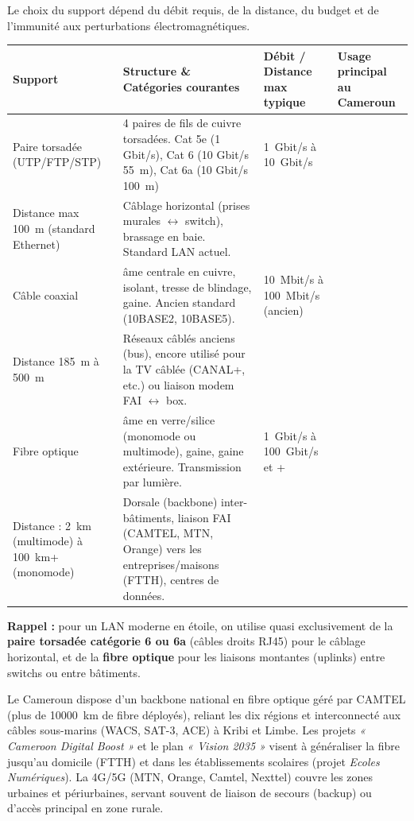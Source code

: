 \documentclass[11pt]{article}
\newcommand{\cle}[1]{{\popxbold\color{popdark}#1}}
\begin{document}
\begin{propriete}
Le choix du support dépend du débit requis, de la distance, du budget et de l'immunité aux perturbations électromagnétiques.
\begin{center}
\begin{tabularx}{\linewidth}{|l|X|X|X|}
\hline
\rowcolor{popblueL} \textbf{Support} & \textbf{Structure \& Catégories courantes} & \textbf{Débit / Distance max typique} & \textbf{Usage principal au Cameroun} \\
\hline
\cle{Paire torsadée} (UTP/FTP/STP) & 4 paires de fils de cuivre torsadées. Cat 5e (1 Gbit/s), Cat 6 (10 Gbit/s \SI{55}{m}), Cat 6a (10 Gbit/s \SI{100}{m}) & \SI{1}{Gbit/s} à \SI{10}{Gbit/s} \\ Distance max \SI{100}{m} (standard Ethernet) & Câblage horizontal (prises murales $\leftrightarrow$ switch), brassage en baie. Standard LAN actuel. \\
\hline
\cle{Câble coaxial} &âme centrale en cuivre, isolant, tresse de blindage, gaine. Ancien standard (10BASE2, 10BASE5). & \SI{10}{Mbit/s} à \SI{100}{Mbit/s} (ancien) \\ Distance \SI{185}{m} à \SI{500}{m} & Réseaux câblés anciens (bus), encore utilisé pour la TV câblée (CANAL+, etc.) ou liaison modem FAI $\leftrightarrow$ box. \\
\hline
\cle{Fibre optique} &âme en verre/silice (monomode ou multimode), gaine, gaine extérieure. Transmission par lumière. & \SI{1}{Gbit/s} à \SI{100}{Gbit/s} et + \\ Distance : \SI{2}{km} (multimode) à \SI{100}{km}+ (monomode) & Dorsale (backbone) inter-bâtiments, liaison FAI (CAMTEL, MTN, Orange) vers les entreprises/maisons (FTTH), centres de données. \\
\hline
\end{tabularx}
\end{center}
\textbf{Rappel :} pour un LAN moderne en étoile, on utilise quasi exclusivement de la \textbf{paire torsadée catégorie 6 ou 6a} (câbles droits RJ45) pour le câblage horizontal, et de la \textbf{fibre optique} pour les liaisons montantes (uplinks) entre switchs ou entre bâtiments.
\end{propriete}

\begin{savaistu}
Le Cameroun dispose d'un backbone national en fibre optique géré par CAMTEL (plus de \SI{10000}{km} de fibre déployés), reliant les dix régions et interconnecté aux câbles sous-marins (WACS, SAT-3, ACE) à Kribi et Limbe. Les projets \emph{« Cameroon Digital Boost »} et le plan \emph{« Vision 2035 »} visent à généraliser la fibre jusqu'au domicile (FTTH) et dans les établissements scolaires (projet \emph{Ecoles Numériques}). La 4G/5G (MTN, Orange, Camtel, Nexttel) couvre les zones urbaines et périurbaines, servant souvent de liaison de secours (backup) ou d'accès principal en zone rurale.
\end{savaistu}
\end{document}
